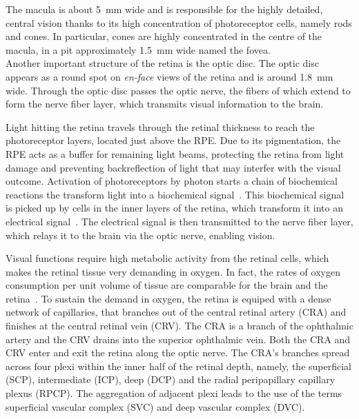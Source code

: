 \documentclass[12pt,a4paper]{journal}
\begin{document}
The macula is about \SI{5}{\mm} wide and is responsible for the highly detailed, central vision thanks to its high concentration of photoreceptor cells, namely rods and cones.
In particular, cones are highly concentrated in the centre of the macula, in a pit approximately \SI{1.5}{\mm} wide named the fovea.\\
Another important structure of the retina is the optic disc.
The optic disc appears as a round spot on \textit{en-face} views of the retina and is around \SI{1.8}{\mm} wide.
Through the optic disc passes the optic nerve, the fibers of which extend to form the nerve fiber layer, which transmits visual information to the brain.

Light hitting the retina travels through the retinal thickness to reach the photoreceptor layers, located just above the RPE.
Due to its pigmentation, the RPE acts as a buffer for remaining light beams, protecting the retina from light damage and preventing backreflection of light that may interfer with the visual outcome.
Activation of photoreceptors by photon starts a chain of biochemical reactions the transform light into a biochemical signal~\cite{Hurley2009}.
This biochemical signal is picked up by cells in the inner layers of the retina, which transform it into an electrical signal~\cite{Arslan2018}.
The electrical signal is then transmitted to the nerve fiber layer, which relays it to the brain via the optic nerve, enabling vision.

Visual functions require high metabolic activity from the retinal cells, which makes the retinal tissue very demanding in oxygen.
In fact, the rates of oxygen consumption per unit volume of tissue are comparable for the brain and the retina~\cite{Medrano1995}.
To sustain the demand in oxygen, the retina is equiped with a dense network of capillaries, that branches out of the central retinal artery (CRA) and finishes at the central retinal vein (CRV).
The CRA is a branch of the ophthalmic artery and the CRV drains into the superior ophthalmic vein.
Both the CRA and CRV enter and exit the retina along the optic nerve.
The CRA's branches spread across four plexi within the inner half of the retinal depth, namely, the superficial (SCP), intermediate (ICP), deep (DCP) and the radial peripapillary capillary plexus (RPCP).
The aggregation of adjacent plexi leads to the use of the terms superficial vascular complex (SVC) and deep vascular complex (DVC).
\end{document}
